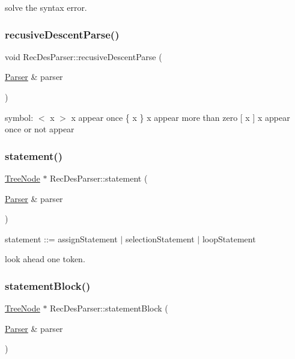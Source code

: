 solve the syntax error. \hypertarget{class_rec_des_parser_a68ff046dddb08a9cb19326c0ef619cf5}{}\label{class_rec_des_parser_a68ff046dddb08a9cb19326c0ef619cf5} 
\subsubsection{\texorpdfstring{recusive\+Descent\+Parse()}{recusiveDescentParse()}}
{\footnotesize\ttfamily void Rec\+Des\+Parser\+::recusive\+Descent\+Parse (\begin{DoxyParamCaption}\item[{\hyperlink{class_parser}{Parser} \&}]{parser }\end{DoxyParamCaption})\hspace{0.3cm}{\ttfamily [static]}}

symbol\+: $<$ x $>$ x appear once \{ x \} x appear more than zero \mbox{[} x \mbox{]} x appear once or not appear \hypertarget{class_rec_des_parser_a4a1fdc2b0e31b91a9e834ad60b396b37}{}\label{class_rec_des_parser_a4a1fdc2b0e31b91a9e834ad60b396b37} 
\subsubsection{\texorpdfstring{statement()}{statement()}}
{\footnotesize\ttfamily \hyperlink{class_tree_node}{Tree\+Node} $\ast$ Rec\+Des\+Parser\+::statement (\begin{DoxyParamCaption}\item[{\hyperlink{class_parser}{Parser} \&}]{parser }\end{DoxyParamCaption})\hspace{0.3cm}{\ttfamily [static]}}



statement \+:\+:= assign\+Statement $\vert$ selection\+Statement $\vert$ loop\+Statement 

look ahead one token. \hypertarget{class_rec_des_parser_a80e51116fe42f872f43c351dba1b50eb}{}\label{class_rec_des_parser_a80e51116fe42f872f43c351dba1b50eb} 
\subsubsection{\texorpdfstring{statement\+Block()}{statementBlock()}}
{\footnotesize\ttfamily \hyperlink{class_tree_node}{Tree\+Node} $\ast$ Rec\+Des\+Parser\+::statement\+Block (\begin{DoxyParamCaption}\item[{\hyperlink{class_parser}{Parser} \&}]{parser }\end{DoxyParamCaption})\hspace{0.3cm}{\ttfamily [static]}}



